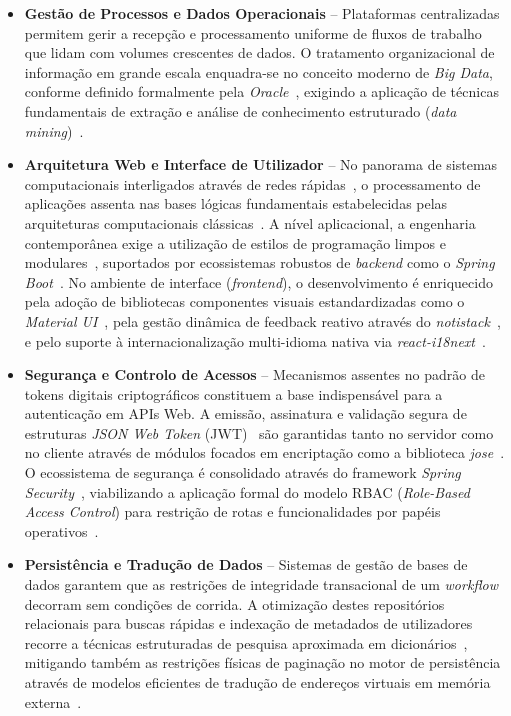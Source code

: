 \begin{itemize}
    \item \textbf{Gestão de Processos e Dados Operacionais} -- Plataformas centralizadas permitem gerir a recepção e processamento uniforme de fluxos de trabalho que lidam com volumes crescentes de dados. O tratamento organizacional de informação em grande escala enquadra-se no conceito moderno de \textit{Big Data}, conforme definido formalmente pela \textit{Oracle}~\cite{oracle-bigdata}, exigindo a aplicação de técnicas fundamentais de extração e análise de conhecimento estruturado (\textit{data mining})~\cite{6547630}.
    
    \item \textbf{Arquitetura Web e Interface de Utilizador} -- No panorama de sistemas computacionais interligados através de redes rápidas~\cite{6824752}, o processamento de aplicações assenta nas bases lógicas fundamentais estabelecidas pelas arquiteturas computacionais clássicas~\cite{Neumann:1958:CB:578873}. A nível aplicacional, a engenharia contemporânea exige a utilização de estilos de programação limpos e modulares~\cite{Kernighan:1982:EPS:578130}, suportados por ecossistemas robustos de \textit{backend} como o \textit{Spring Boot}~\cite{spring-boot}. No ambiente de interface (\textit{frontend}), o desenvolvimento é enriquecido pela adoção de bibliotecas componentes visuais estandardizadas como o \textit{Material UI}~\cite{material-ui}, pela gestão dinâmica de feedback reativo através do \textit{notistack}~\cite{notistack}, e pelo suporte à internacionalização multi-idioma nativa via \textit{react-i18next}~\cite{react-i18next}.
    
    \item \textbf{Segurança e Controlo de Acessos} -- Mecanismos assentes no padrão de tokens digitais criptográficos constituem a base indispensável para a autenticação em APIs Web. A emissão, assinatura e validação segura de estruturas \textit{JSON Web Token} (JWT)~\cite{rfc-jwt} são garantidas tanto no servidor como no cliente através de módulos focados em encriptação como a biblioteca \textit{jose}~\cite{jose}. O ecossistema de segurança é consolidado através do framework \textit{Spring Security}~\cite{spring-security}, viabilizando a aplicação formal do modelo RBAC (\textit{Role-Based Access Control}) para restrição de rotas e funcionalidades por papéis operativos~\cite{nist-rbac}.
    
    \item \textbf{Persistência e Tradução de Dados} -- Sistemas de gestão de bases de dados garantem que as restrições de integridade transacional de um \textit{workflow} decorram sem condições de corrida. A otimização destes repositórios relacionais para buscas rápidas e indexação de metadados de utilizadores recorre a técnicas estruturadas de pesquisa aproximada em dicionários~\cite{Boytsov:2011:IMA:1963190.1963191}, mitigando também as restrições físicas de paginação no motor de persistência através de modelos eficientes de tradução de endereços virtuais em memória externa~\cite{Jurkiewicz:2015:MVA:2627368.2656337}.
\end{itemize}

